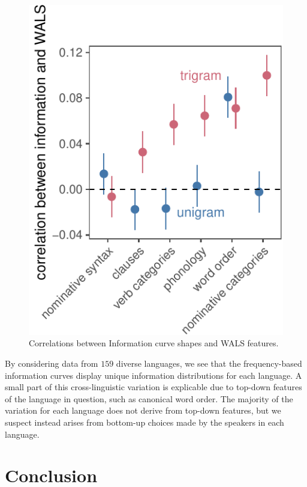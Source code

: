 \documentclass[10pt, letterpaper]{article}
\newenvironment{CodeChunk}{}{}
\begin{document}
\begin{CodeChunk}
\begin{figure}[tb]
\includegraphics{figs/type_cors-1} \caption[Correlations between Information curve shapes and WALS features]{Correlations between Information curve shapes and WALS features.}\label{fig:type_cors}
\end{figure}
\end{CodeChunk}

By considering data from \(159\) diverse languages, we see that the
frequency-based information curves display unique information
distributions for each language. A small part of this cross-linguistic
variation is explicable due to top-down features of the language in
question, such as canonical word order. The majority of the variation
for each language does not derive from top-down features, but we suspect
instead arises from bottom-up choices made by the speakers in each
language.

\hypertarget{conclusion}{%
\section{Conclusion}\label{conclusion}}
\end{document}
